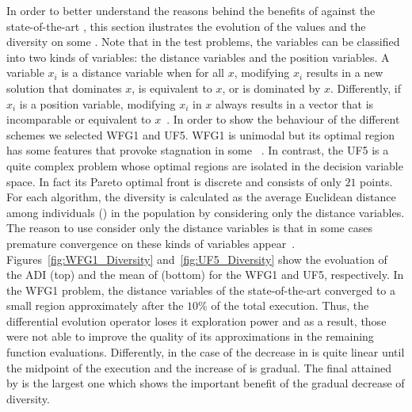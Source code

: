 In order to better understand the reasons behind the benefits of \AVSDMOEAD{} against the state-of-the-art \MOEAS{},
this section ilustrates the evolution of the \HV{} values and the diversity on some \MOPS{}.
%
Note that in the \WFG{} test problems, the variables can be classified into two kinds of variables: 
the distance variables and the position variables.
%
A variable $x_i$ is a distance variable when for all $x$, modifying $x_i$ results in a new solution 
that dominates $x$, is equivalent to $x$, or is dominated by $x$.
%
Differently, if $x_i$ is a position variable, modifying $x_i$ in $x$ always results in a vector that is 
incomparable or equivalent to $x$~\cite{huband2006review}.
%
In order to show the behaviour of the different schemes we selected WFG1 and UF5.
%
WFG1 is unimodal but its optimal region has some features that provoke stagnation in some \MOEAS{}~\cite{castillo2017multi}.
%
In contrast, the UF5 is a quite complex problem whose optimal regions are isolated in the decision variable 
space.
%
In fact its Pareto optimal front is discrete and consists of only $21$ points.
%
For each algorithm, the diversity is calculated as the average Euclidean distance among individuals (\ADI{}) in the population 
by considering only the distance variables.
%
The reason to use consider only the distance variables is that in some cases premature convergence on these kinds of 
variables appear~\cite{castillo2017multi}.
%
Figures~\ref{fig:WFG1_Diversity} and~\ref{fig:UF5_Diversity} show the evoluation of the ADI (top) and the mean of \HV{} (bottom) 
for the WFG1 and UF5, respectively.
%
In the WFG1 problem, the distance variables of the state-of-the-art \MOEAS{} converged to a small region 
approximately after the $10\%$ of the total execution.
%
Thus, the differential evolution operator loses it exploration power and as a result,
those \MOEAS{} were not able to improve the quality of its approximations in the remaining function evaluations. 
%
Differently, in the case of \AVSDMOEAD{} the decrease in \ADI{} is quite linear until the midpoint of the execution and
the increase of \HV{} is gradual.
%
The final \HV{} attained by \AVSDMOEAD{} is the largest one which shows the important benefit
of the gradual decrease of diversity.

